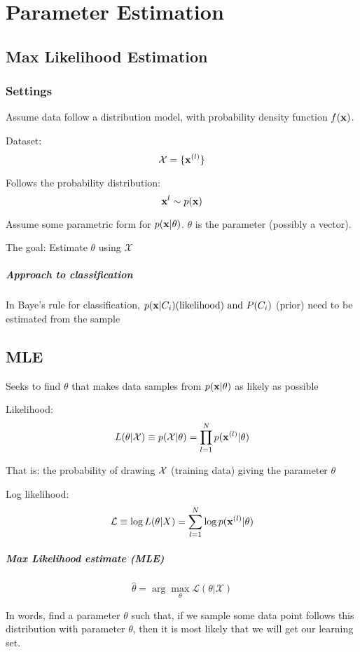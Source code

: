\chapter{Parameter Estimation}
\section{Max Likelihood Estimation}
\subsection{Settings}
Assume data follow a distribution model, with probability density function
$f(\mathbf{x})$. 

Dataset: \[\mathcal{X}=\{\mathbf{x}^{(l)}\}\]

Follows the probability distribution: \[\mathbf{x}^{l}\sim p(\mathbf{x})\]

Assume some parametric form for $p(\mathbf{x}|\theta)$. $\theta$ is the parameter
(possibly a vector).

The goal: Estimate $\theta$ using $\mathcal{X}$

\paragraph{Approach to classification} In Baye's rule for classification,
$p(\mathbf{x}|C_i) \mbox{(likelihood) and } P(C_i)$ (prior) need to be estimated from the sample 
\section{MLE}
Seeks to find $\theta$ that makes data samples from $p(\mathbf{x}|\theta)$ as
likely as possible

Likelihood:\[L(\theta|\mathcal{X}) \equiv p(\mathcal{X}|\theta) =
    \prod^N_{l=1}p(\mathbf{x}^{(l)}|\theta)\]

That is: the probability of drawing $\mathcal{X}$ (training data) giving the
parameter $\theta$

Log likelihood: 
\[\mathcal{L} \equiv \log L(\theta|X) = \sum^N_{l=1}\log
p(\mathbf{x}^{(l)}|\theta)\]

\paragraph{Max Likelihood estimate (MLE)} 
\[\hat{\theta} = \arg\max_{\theta}\mathcal{L}(\theta|\mathcal{X})\]

In words, find a parameter $\theta$ such that, if we sample some data
point follows this distribution with parameter $\theta$, then it is most
likely that we will get our learning set.

